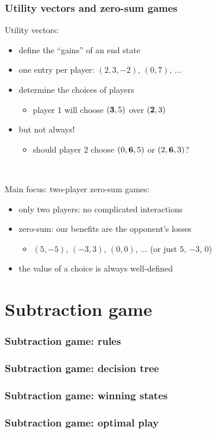 \documentclass[12pt]{beamer}
\begin{document}
\begin{frame}
\frametitle{Utility vectors and zero-sum games}
Utility vectors:
\begin{itemize}
\item define the ``gains'' of an end state
\item one entry per player: $(2,3,-2)$, $(0,7)$, ...
\item determine the choices of players
\begin{itemize} \item player 1 will choose $({\bf 3},5)$ over $({\bf 2},3)$ \end{itemize}
\item but not always!
\begin{itemize} \item should player 2 choose $(0,{\bf 6},5)$ or $(2,{\bf 6},3)$? \end{itemize}
\end{itemize}

~

Main focus: two-player zero-sum games:
\begin{itemize}
\item only two players: no complicated interactions
\item zero-sum: our benefits are the opponent's losses
\begin{itemize} \item $(5,-5)$, $(-3,3)$, $(0,0)$, ... (or just $5$, $-3$, $0$) \end{itemize}
\item the value of a choice is always well-defined
\end{itemize}
\end{frame}


\section{Subtraction game}
\begin{frame}
\frametitle{Subtraction game: rules}
\end{frame}

\begin{frame}
\frametitle{Subtraction game: decision tree}
\end{frame}

\begin{frame}
\frametitle{Subtraction game: winning states}
\end{frame}

\begin{frame}
\frametitle{Subtraction game: optimal play}
\end{frame}
\end{document}
